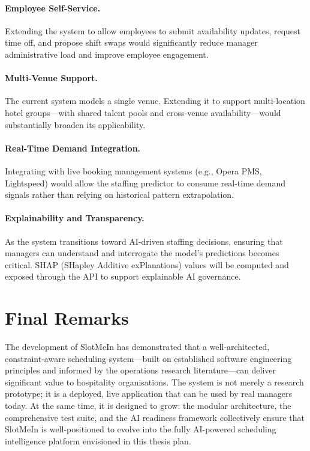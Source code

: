 \paragraph{Employee Self-Service.} Extending the system to allow employees to submit availability updates, request time off, and propose shift swaps would significantly reduce manager administrative load and improve employee engagement.

\paragraph{Multi-Venue Support.} The current system models a single venue. Extending it to support multi-location hotel groups—with shared talent pools and cross-venue availability—would substantially broaden its applicability.

\paragraph{Real-Time Demand Integration.} Integrating with live booking management systems (e.g., Opera PMS, Lightspeed) would allow the staffing predictor to consume real-time demand signals rather than relying on historical pattern extrapolation.

\paragraph{Explainability and Transparency.} As the system transitions toward AI-driven staffing decisions, ensuring that managers can understand and interrogate the model's predictions becomes critical. SHAP (SHapley Additive exPlanations) \cite{lundberg_lee_2017} values will be computed and exposed through the API to support explainable AI governance.

\section{Final Remarks}

The development of SlotMeIn has demonstrated that a well-architected, constraint-aware scheduling system—built on established software engineering principles and informed by the operations research literature—can deliver significant value to hospitality organisations. The system is not merely a research prototype; it is a deployed, live application that can be used by real managers today. At the same time, it is designed to grow: the modular architecture, the comprehensive test suite, and the AI readiness framework collectively ensure that SlotMeIn is well-positioned to evolve into the fully AI-powered scheduling intelligence platform envisioned in this thesis plan.

